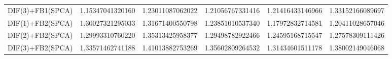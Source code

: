 \begin{table}[htb]
\begin{adjustbox}{totalheight=\baselineskip}
\begin{tabular}{lSSSSS}
DIF(3)+FB1(SPCA) & 1.15347041320160 & 1.23011087062022 & 1.21056767331416 & 1.21416433146966 & 1.33152166089697 \\ 
DIF(1)+FB2(SPCA) & 1.30027321295033 & 1.31671400550798 & 1.23851010537340 & 1.17972832714581 & 1.20411028657046 \\ 
DIF(2)+FB2(SPCA) & 1.29993310760220 & 1.35313425958377 & 1.29498782922466 & 1.24595168715547 & 1.27578309111426 \\ 
DIF(3)+FB2(SPCA) & 1.33571462741188 & 1.41013882753269 & 1.35602809264532 & 1.31434601511178 & 1.38002149046068 \\ \bottomrule 
\end{tabular}
\end{adjustbox}
\end{table}